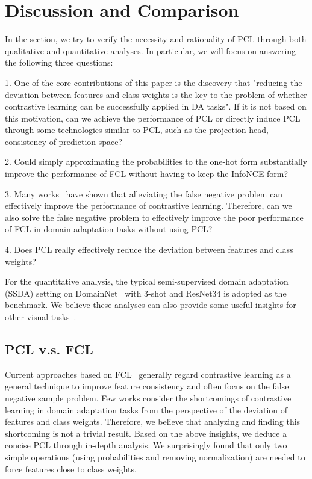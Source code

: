 

\section{Discussion and Comparison}
In the section, we try to verify the necessity and rationality of PCL through both qualitative and quantitative analyses.
In particular, we will focus on answering the following three questions:

1. One of the core contributions of this paper is the discovery that "reducing the deviation between features and class weights is the key to the problem of whether contrastive learning can be successfully applied in DA tasks". If it is not based on this motivation, can we achieve the performance of PCL or directly induce PCL through some technologies similar to PCL, such as the projection head, consistency of prediction space?

2. Could simply approximating the probabilities to the one-hot form substantially improve the performance of FCL without having to keep the InfoNCE form?

3. Many works~\cite{dwibedi2021little,khosla2020supervised,xu2020hierarchical} have shown that alleviating the false negative problem can effectively improve the performance of contrastive learning. Therefore, can we also solve the false negative problem to effectively improve the poor performance of FCL in domain adaptation tasks without using PCL?


4. Does PCL really effectively reduce the deviation between features and class weights?

For the quantitative analysis, the typical semi-supervised domain adaptation (SSDA) setting on DomainNet~\cite{peng2019moment} with 3-shot and ResNet34 is adopted as the benchmark.
We believe these analyses can also provide some useful insights for other visual tasks~\cite{hou2019learning,mohri2019agnostic,li2021learning}.
\subsection{PCL v.s. FCL}
Current approaches based on FCL~\cite{singh2021clda,singh2021semi,zhou2022domain} generally regard contrastive learning as a general technique to improve feature consistency and often focus on the false negative sample problem.
Few works consider the shortcomings of contrastive learning in domain adaptation tasks from the perspective of the deviation of features and class weights.
Therefore, we believe that analyzing and finding this shortcoming is not a trivial result.
Based on the above insights, we deduce a concise PCL through in-depth analysis.
We surprisingly found that only two simple operations (using probabilities and removing  normalization) are needed to force features close to class weights.


